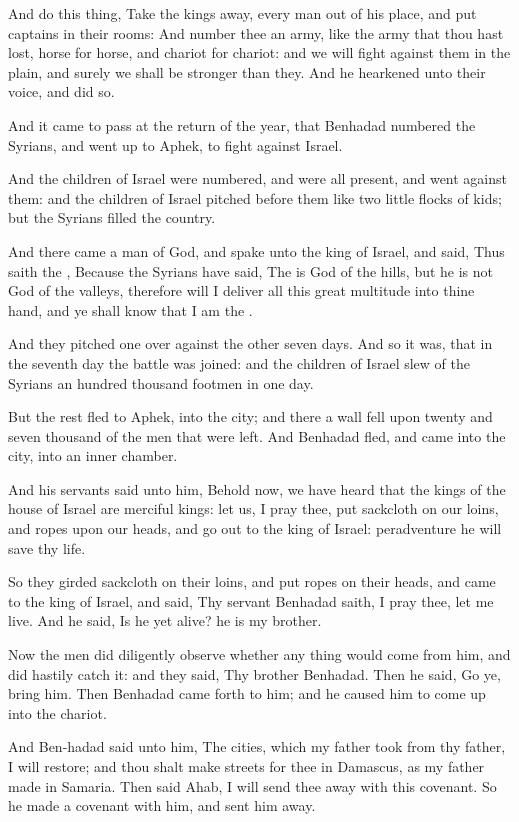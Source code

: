 \verse And do this thing, Take the kings away, every man out of his place, and put captains in their rooms: \verse And number thee an army, like the army that thou hast lost, horse for horse, and chariot for chariot: and we will fight against them in the plain, and surely we shall be stronger than they. And he hearkened unto their voice, and did so.

\verse And it came to pass at the return of the year, that Benhadad numbered the Syrians, and went up to Aphek, to fight against Israel.

\verse And the children of Israel were numbered, and were all present, and went against them: and the children of Israel pitched before them like two little flocks of kids; but the Syrians filled the country.

\verse And there came a man of God, and spake unto the king of Israel, and said, Thus saith the \LORD, Because the Syrians have said, The \LORD is God of the hills, but he is not God of the valleys, therefore will I deliver all this great multitude into thine hand, and ye shall know that I am the \LORD.

\verse And they pitched one over against the other seven days. And so it was, that in the seventh day the battle was joined: and the children of Israel slew of the Syrians an hundred thousand footmen in one day.

\verse But the rest fled to Aphek, into the city; and there a wall fell upon twenty and seven thousand of the men that were left. And Benhadad fled, and came into the city, into an inner chamber.

\verse And his servants said unto him, Behold now, we have heard that the kings of the house of Israel are merciful kings: let us, I pray thee, put sackcloth on our loins, and ropes upon our heads, and go out to the king of Israel: peradventure he will save thy life.

\verse So they girded sackcloth on their loins, and put ropes on their heads, and came to the king of Israel, and said, Thy servant Benhadad saith, I pray thee, let me live. And he said, Is he yet alive? he is my brother.

\verse Now the men did diligently observe whether any thing would come from him, and did hastily catch it: and they said, Thy brother Benhadad. Then he said, Go ye, bring him. Then Benhadad came forth to him; and he caused him to come up into the chariot.

\verse And Ben-hadad said unto him, The cities, which my father took from thy father, I will restore; and thou shalt make streets for thee in Damascus, as my father made in Samaria. Then said Ahab, I will send thee away with this covenant. So he made a covenant with him, and sent him away.

